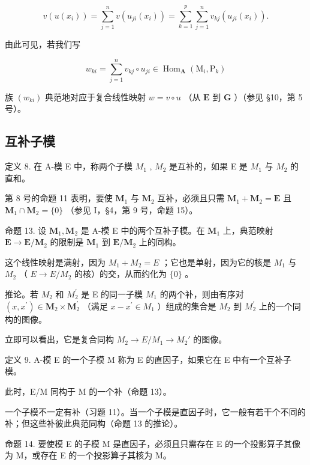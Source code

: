 \[
v (u (x _ {i})) = \sum_ {j = 1} ^ {n} v (u _ {j i} (x _ {i})) = \sum_ {k = 1} ^ {p} \sum_ {j = 1} ^ {n} v _ {k j} (u _ {j i} (x _ {i})).
\]

由此可见，若我们写

\[
w _ {k i} = \sum_ {j = 1} ^ {n} v _ {k j} \circ u _ {j i} \in \operatorname{Hom} _ {\mathbf {A}} (\mathrm{M} _ {i}, \mathrm{P} _ {k})\tag{32}
\]

族 \((w_{ki})\) 典范地对应于复合线性映射 \(w = v \circ u\) （从 \(\mathbf{E}\) 到 \(\mathbf{G}\) ）（参见 §10，第 5 号）。

\subsection{互补子模}

定义 8. 在 A-模 E 中，称两个子模 \(M_{1}\) , \(M_{2}\) 是互补的，如果 E 是 \(M_{1}\) 与 \(M_{2}\) 的直和。

第 8 号的命题 11 表明，要使 \(\mathbf{M}_1\) 与 \(\mathbf{M}_2\) 互补，必须且只需 \(\mathbf{M}_1 + \mathbf{M}_2 = \mathbf{E}\) 且 \(\mathbf{M}_1 \cap \mathbf{M}_2 = \{0\}\) （参见 I，§4，第 9 号，命题 15）。

命题 13. 设 \(\mathbf{M}_1, \mathbf{M}_2\) 是 A-模 E 中的两个互补子模。在 \(\mathbf{M}_1\) 上，典范映射 \(\mathbf{E} \to \mathbf{E} / \mathbf{M}_2\) 的限制是 \(\mathbf{M}_1\) 到 \(\mathbf{E} / \mathbf{M}_2\) 上的同构。

这个线性映射是满射，因为 \(M_{1} + M_{2} = E\) ；它也是单射，因为它的核是 \(M_{1}\) 与 \(M_{2}\) （ \(E \rightarrow E/M_{2}\) 的核）的交，从而约化为 \(\{0\}\) 。

推论。若 \(M_{2}\) 和 \(M_{2}^{\prime}\) 是 E 的同一子模 \(M_{1}\) 的两个补，则由有序对 \((x, x^{\prime}) \in \mathbf{M}_{2} \times \mathbf{M}_{2}^{\prime}\) （满足 \(x - x^{\prime} \in M_{1}\) ）组成的集合是 \(M_{2}\) 到 \(M_{2}^{\prime}\) 上的一个同构的图像。

立即可以看出，它是复合同构 \(M_{2} \rightarrow E/M_{1} \rightarrow M_{2}'\) 的图像。

定义 9. A-模 E 的一个子模 M 称为 E 的直因子，如果它在 E 中有一个互补子模。

此时，E/M 同构于 M 的一个补（命题 13）。

一个子模不一定有补（习题 11）。当一个子模是直因子时，它一般有若干个不同的补；但这些补彼此典范同构（命题 13 的推论）。

命题 14. 要使模 E 的子模 M 是直因子，必须且只需存在 E 的一个投影算子其像为 M，或存在 E 的一个投影算子其核为 M。

